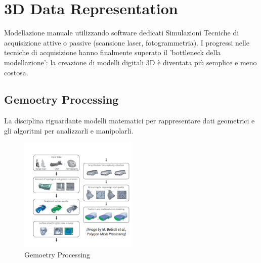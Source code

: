 \section{3D Data Representation}
Modellazione manuale utilizzando software dedicati
Simulazioni
Tecniche di acquisizione attive o passive (scansione laser,
fotogrammetria).
I progressi nelle tecniche di acquisizione hanno finalmente superato il 'bottleneck della modellazione': la creazione di modelli digitali 3D è diventata più semplice e meno costosa.
\subsection{Gemoetry Processing}
La disciplina riguardante modelli matematici per rappresentare dati geometrici e gli algoritmi per analizzarli e manipolarli.
\begin{figure}[H]
    \centering
    \includegraphics[width=0.5\textwidth]{images/3Drend.png} 
    \caption{Gemoetry Processing}
    \label{fig:immagine}
\end{figure}
